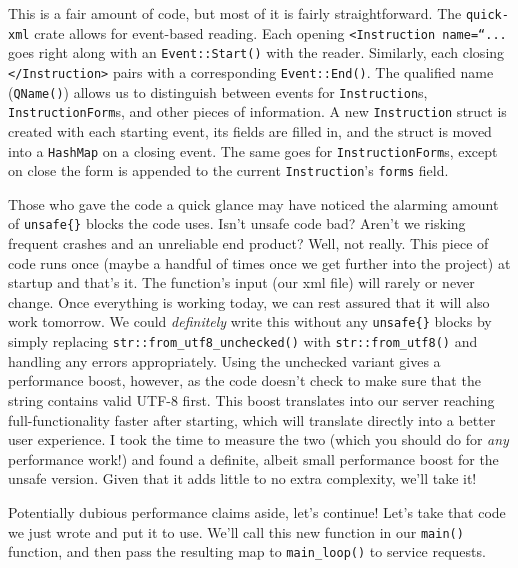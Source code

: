 This is a fair amount of code, but most of it is fairly straightforward. The
\texttt{quick-xml} crate allows for event-based reading. Each opening
\texttt{<Instruction name=``...} goes right along with an \texttt{Event::Start()}
with the reader. Similarly, each closing \texttt{</Instruction>} pairs with a
corresponding \texttt{Event::End()}. The qualified name (\texttt{QName()}) allows
us to distinguish between events for \texttt{Instruction}s, \texttt{InstructionForm}s,
and other pieces of information. A new \texttt{Instruction} struct is created with
each starting event, its fields are filled in, and the struct is moved into a
\texttt{HashMap} on a closing event. The same goes for \texttt{InstructionForm}s,
except on close the form is appended to the current \texttt{Instruction}'s
\texttt{forms} field.

Those who gave the code a quick glance may have noticed
the alarming amount of \texttt{unsafe\{\}} blocks the code uses. Isn't unsafe
code bad? Aren't we risking frequent crashes and an unreliable end product? Well,
not really. This piece of code runs once (maybe a handful of times once we get
further into the project) at startup and that's it. The function's input (our xml
file) will rarely or never change. Once everything is working today, we can rest
assured that it will also work tomorrow. We could \textit{definitely} write this
without any \texttt{unsafe\{\}} blocks by simply replacing 
\texttt{str::from\_utf8\_unchecked()} with \texttt{str::from\_utf8()} and handling
any errors appropriately. Using the unchecked variant gives a performance boost,
however, as the code doesn't check to make sure that the string contains valid
UTF-8 first. This boost translates into our server reaching full-functionality
faster after starting, which will translate directly into a better user experience.
I took the time to measure the two (which you should do for \textit{any} performance
work!) and found a definite, albeit small performance boost for the unsafe version.
Given that it adds little to no extra complexity, we'll take it!

Potentially dubious performance claims aside, let's continue! Let's take that code
we just wrote and put it to use. We'll call this new function in our \texttt{main()}
function, and then pass the resulting map to \texttt{main\_loop()} to service
requests.

